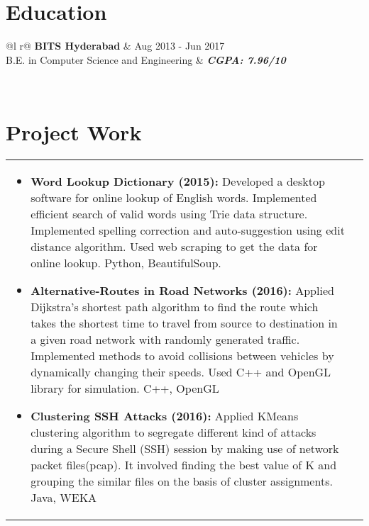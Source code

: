 \documentclass[a4paper,8pt]{article}
\begin{document}
\section{Education}
\begin{tabularx}{\linewidth}{ @{}l r@{} }
\color[HTML]{1C033C} \textbf{BITS Hyderabad} & \hfill \color[HTML]{371e77} Aug 2013 - Jun 2017 \\
\color[HTML]{371e77} B.E. in Computer Science and Engineering & \hfill \color[HTML]{4B28A4} \textit{\textbf{CGPA: 7.96/10}} \\
\end{tabularx}\\[3pt]

\section{Project Work}
\begin{tabularx}{\linewidth}{ @{}l r@{} }
\begin{minipage}[t]{\linewidth}
    \begin{itemize}[nosep,after=\strut, leftmargin=2em, itemsep=2pt]
        \item \textbf{Word Lookup Dictionary (2015):} Developed a desktop software for online lookup of English words. Implemented
efficient search of valid words using Trie data structure. Implemented spelling correction and auto-suggestion using edit distance algorithm. Used web scraping to get the data for online lookup. Python, BeautifulSoup.
        \item \textbf{Alternative-Routes in Road Networks (2016):} Applied Dijkstra’s shortest path algorithm to find the route which takes the shortest time to travel from source to destination in a given road network with randomly generated traffic. Implemented methods to avoid collisions between vehicles by dynamically changing their speeds. Used C++ and OpenGL library for simulation. C++, OpenGL
        \item \textbf{Clustering SSH Attacks (2016):} Applied KMeans clustering algorithm to segregate different kind of attacks during a Secure Shell (SSH) session by making use of network packet files(pcap). It involved finding the best value of K and grouping the similar files on the basis of cluster assignments. Java, WEKA
    \end{itemize}
    \end{minipage}
\end{tabularx}\\[3pt]
\end{document}

